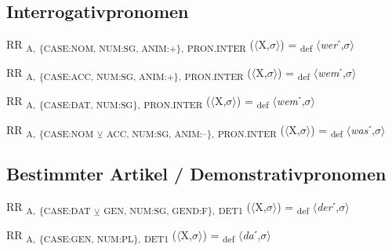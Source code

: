 {\subsection{Interrogativpronomen}

\begin{exe}
 RR \textsubscript{A,} \textsubscript{\{CASE:NOM, NUM:SG, ANIM:+\},} \textsubscript{PRON.INTER} ($\langle$X,$\sigma $$\rangle$) = \textsubscript{def} $\langle$\textit{wer}ˊ,$\sigma $$\rangle$
\end{exe}

\begin{exe}
 RR \textsubscript{A,} \textsubscript{\{CASE:ACC, NUM:SG, ANIM:+\},} \textsubscript{PRON.INTER} ($\langle$X,$\sigma $$\rangle$) = \textsubscript{def} $\langle$\textit{wem}ˊ,$\sigma $$\rangle$
\end{exe}

\begin{exe}
 RR \textsubscript{A,} \textsubscript{\{CASE:DAT, NUM:SG\},} \textsubscript{PRON.INTER} ($\langle$X,$\sigma $$\rangle$) = \textsubscript{def} $\langle$\textit{wem}ˊ,$\sigma $$\rangle$
\end{exe}

\begin{exe}
 RR \textsubscript{A,} \textsubscript{\{CASE:NOM} \textsubscript{${\veebar}$}\textsubscript{ ACC, NUM:SG, ANIM:–\},} \textsubscript{PRON.INTER} ($\langle$X,$\sigma $$\rangle$) = \textsubscript{def} $\langle$\textit{was}ˊ,$\sigma $$\rangle$
\end{exe}

\subsection{Bestimmter Artikel / Demonstrativpronomen}

\begin{exe}
 RR \textsubscript{A,} \textsubscript{\{CASE:DAT} \textsubscript{${\veebar}$}\textsubscript{ GEN, NUM:SG, GEND:F\},} \textsubscript{DET1} ($\langle$X,$\sigma $$\rangle$) = \textsubscript{def} $\langle$\textit{der}ˊ,$\sigma $$\rangle$
\end{exe}

\begin{exe}
 RR \textsubscript{A,} \textsubscript{\{CASE:GEN, NUM:PL\},} \textsubscript{DET1} ($\langle$X,$\sigma $$\rangle$) = \textsubscript{def} $\langle$\textit{da}ˊ,$\sigma $$\rangle$
\end{exe}

}
